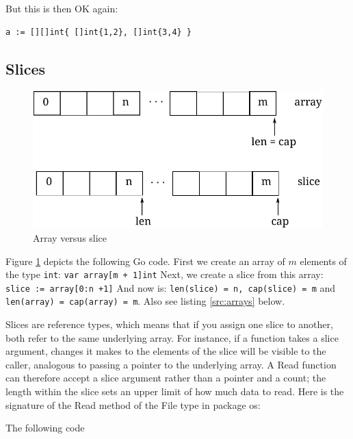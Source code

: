 But this is then OK again:
\begin{lstlisting}
a := [][]int{ []int{1,2}, []int{3,4} }
\end{lstlisting}

\subsection{Slices}

\begin{figure}[!bh]
\caption{Array versus slice}
\label{fig:array-vs-slice}
\begin{center}
\includegraphics[scale=0.65]{fig/array-vs-slice.pdf}
\end{center}
\end{figure}
Figure \ref{fig:array-vs-slice} depicts the following Go code.
First we create an array of $m$ elements of the type \lstinline{int}:
\lstinline{var array[m + 1]int}\newline
Next, we create a slice from this array: 
\lstinline{slice := array[0:n +1]}\newline
And now is: \lstinline{len(slice) = n, cap(slice) = m} and
\lstinline{len(array) = cap(array) = m}.\newline
Also see listing \ref{src:arrays} below.

Slices are reference types, which means that if you assign one slice to
another, both refer to the same underlying array. For instance, if a
function takes a slice argument, changes it makes to the elements of the
slice will be visible to the caller, analogous to passing a pointer to
the underlying array. A Read function can therefore accept a slice
argument rather than a pointer and a count; the length within the slice
sets an upper limit of how much data to read. Here is the signature of
the Read method of the File type in package os:

The following code 



